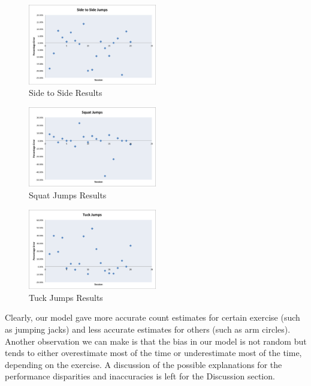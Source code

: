 \begin{figure} [htp]
	\includegraphics[width=0.5\textwidth]{images/sidetoside}
\caption{Side to Side Results}
\end{figure}
\begin{figure} [htp]
	\includegraphics[width=0.5\textwidth]{images/squatjumps}
\caption{Squat Jumps Results}
\end{figure}
\begin{figure} [h!]
	\includegraphics[width=0.5\textwidth]{images/tuckjumps}
\caption{Tuck Jumps Results}
\end{figure} 
Clearly, our model gave more accurate count estimates for certain exercise (such as jumping jacks) and less accurate estimates for others (such as arm circles). 
Another observation we can make is that the bias in our model is not random but tends to either overestimate most of the time or underestimate most of the time, depending on the exercise.
A discussion of the possible explanations for the performance disparities and inaccuracies is left for the Discussion section. \\
